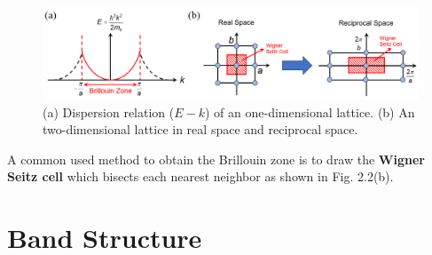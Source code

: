 \begin{figure}[tbp]
\includegraphics[width=\textwidth]{figures/Fig2_2}
\centering
\caption{\small (a) Dispersion relation ($E-k$) of an one-dimensional lattice. (b) An two-dimensional lattice in real space and reciprocal space.}
\end{figure} A common used method to obtain the Brillouin zone is to draw the {\bf Wigner Seitz cell} which bisects each nearest neighbor as shown in Fig. 2.2(b).
\section{Band Structure}
